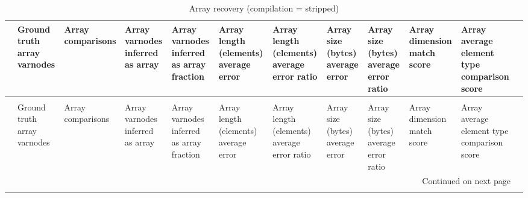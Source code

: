 \begin{longtable}{lp{1.00cm}p{1.00cm}p{1.00cm}p{1.00cm}p{1.00cm}p{1.00cm}p{1.00cm}p{1.00cm}p{1.00cm}p{1.00cm}p{1.00cm}}
\caption{Array recovery (compilation = stripped)}
\label{table:array-comparisons-O0-strip}\\
\toprule
{} &  Ground truth array varnodes &  Array comparisons &  Array varnodes inferred as array &  Array varnodes inferred as array fraction &  Array length (elements) average error &  Array length (elements) average error ratio &  Array size (bytes) average error &  Array size (bytes) average error ratio &  Array dimension match score &  Array average element type comparison score \\
\midrule
\endfirsthead
\caption[]{Array recovery (compilation = stripped)} \\
\toprule
{} &  Ground truth array varnodes &  Array comparisons &  Array varnodes inferred as array &  Array varnodes inferred as array fraction &  Array length (elements) average error &  Array length (elements) average error ratio &  Array size (bytes) average error &  Array size (bytes) average error ratio &  Array dimension match score &  Array average element type comparison score \\
\midrule
\endhead
\midrule
\multicolumn{11}{r}{{Continued on next page}} \\
\midrule
\endfoot


\end{longtable}
